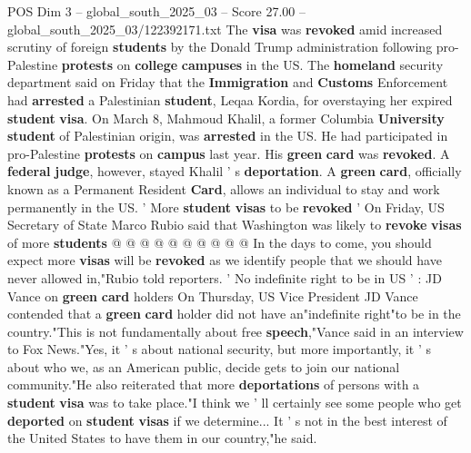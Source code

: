 \begin{textsample}{POS Dim 3 – global\_south\_2025\_03 – Score 27.00 – global\_south\_2025\_03/122392171.txt}
The \textbf{visa} was \textbf{revoked} amid increased scrutiny of foreign \textbf{students} by the Donald Trump administration following pro-Palestine \textbf{protests} on \textbf{college} \textbf{campuses} in the US.
The \textbf{homeland} security department said on Friday that the \textbf{Immigration} and \textbf{Customs} Enforcement had \textbf{arrested} a Palestinian \textbf{student}, Leqaa Kordia, for overstaying her expired \textbf{student} \textbf{visa}.
On March 8, Mahmoud Khalil, a former Columbia \textbf{University} \textbf{student} of Palestinian origin, was \textbf{arrested} in the US.
He had participated in pro-Palestine \textbf{protests} on \textbf{campus} last year.
His \textbf{green} \textbf{card} was \textbf{revoked}.
A \textbf{federal} \textbf{judge}, however, stayed Khalil ' s \textbf{deportation}.
A \textbf{green} \textbf{card}, officially known as a Permanent Resident \textbf{Card}, allows an individual to stay and work permanently in the US. ' More \textbf{student} \textbf{visas} to be \textbf{revoked} ' On Friday, US Secretary of State Marco Rubio said that Washington was likely to \textbf{revoke} \textbf{visas} of more \textbf{students} @ @ @ @ @ @ @ @ @ @ In the days to come, you should expect more \textbf{visas} will be \textbf{revoked} as we identify people that we should have never allowed in,"Rubio told reporters. ' No indefinite right to be in US ' : JD Vance on \textbf{green} \textbf{card} holders On Thursday, US Vice President JD Vance contended that a \textbf{green} \textbf{card} holder did not have an"indefinite right"to be in the country."This is not fundamentally about free \textbf{speech},"Vance said in an interview to Fox News."Yes, it ' s about national security, but more importantly, it ' s about who we, as an American public, decide gets to join our national community."He also reiterated that more \textbf{deportations} of persons with a \textbf{student} \textbf{visa} was to take place."I think we ' ll certainly see some people who get \textbf{deported} on \textbf{student} \textbf{visas} if we determine...
It ' s not in the best interest of the United States to have them in our country,"he said.

\end{textsample}
